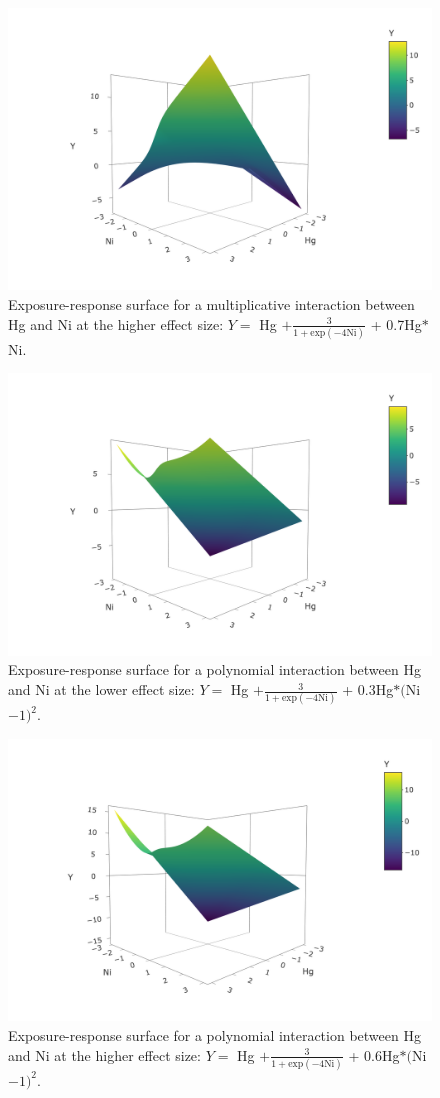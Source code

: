 \documentclass[12pt, twoside]{amherstthesis}
\begin{document}
\begin{figure}

{\centering \includegraphics[width=0.5\linewidth]{figures/surfaces/am2} 

}

\caption{Exposure-response surface for a multiplicative interaction between Hg and Ni at the higher effect size: $Y=$ Hg $+\frac{3}{1+\textrm{exp}(-4\textrm{Ni})}$ + 0.7Hg$*$Ni.}\label{fig:am2}
\end{figure}
\begin{figure}

{\centering \includegraphics[width=0.5\linewidth]{figures/surfaces/ap1} 

}

\caption{Exposure-response surface for a polynomial interaction between Hg and Ni at the lower effect size: $Y=$ Hg $+\frac{3}{1+\textrm{exp}(-4\textrm{Ni})}$ + 0.3Hg$*($Ni$-1)^2$.}\label{fig:ap1}
\end{figure}
\begin{figure}

{\centering \includegraphics[width=0.5\linewidth]{figures/surfaces/ap2} 

}

\caption{Exposure-response surface for a polynomial interaction between Hg and Ni at the higher effect size: $Y=$ Hg $+\frac{3}{1+\textrm{exp}(-4\textrm{Ni})}$ + 0.6Hg$*($Ni$-1)^2$.}\label{fig:ap2}
\end{figure}
\end{document}

